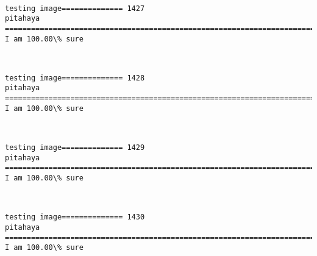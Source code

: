 \documentclass[11pt]{article}
\begin{document}
    \begin{center}
    \end{center}
    { \hspace*{\fill} \\}
    
    \begin{Verbatim}[commandchars=\\\{\}]
testing image============== 1427
pitahaya
============================================================================
I am 100.00\% sure

    \end{Verbatim}

    \begin{center}
    \end{center}
    { \hspace*{\fill} \\}
    
    \begin{Verbatim}[commandchars=\\\{\}]
testing image============== 1428
pitahaya
============================================================================
I am 100.00\% sure

    \end{Verbatim}

    \begin{center}
    \end{center}
    { \hspace*{\fill} \\}
    
    \begin{Verbatim}[commandchars=\\\{\}]
testing image============== 1429
pitahaya
============================================================================
I am 100.00\% sure

    \end{Verbatim}

    \begin{center}
    \end{center}
    { \hspace*{\fill} \\}
    
    \begin{Verbatim}[commandchars=\\\{\}]
testing image============== 1430
pitahaya
============================================================================
I am 100.00\% sure

    \end{Verbatim}
\end{document}

